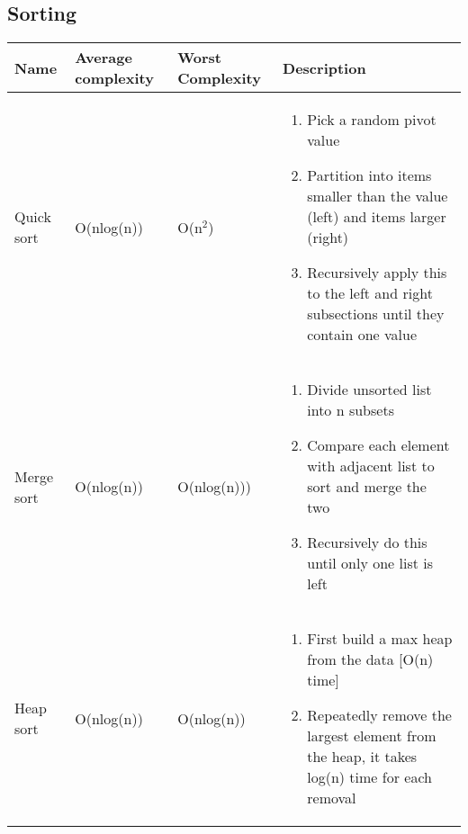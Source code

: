 \subsection{Sorting}

\begin{center}
\begin{longtable}{|l|l|l|p{7cm}|}
\hline
\textbf{Name} & \textbf{Average complexity} & \textbf{Worst Complexity} & \textbf{Description} \\
\hline
Quick sort & O(nlog(n)) & O(n$^{2}$) 
           & \begin{enumerate}
                \item Pick a random pivot value 
                \item Partition into items smaller than the value (left) and 
                      items larger (right)
                \item Recursively apply this to the left and right subsections
                      until they contain one value
              \end{enumerate}\\
\hline

Merge sort & O(nlog(n)) & O(nlog(n))) 
           & \begin{enumerate}
                \item Divide unsorted list into n subsets
                \item Compare each element with adjacent list to sort and merge
                      the two
                \item Recursively do this until only one list is left
              \end{enumerate}\\

\hline

Heap sort & O(nlog(n)) & O(nlog(n)) 
          & \begin{enumerate}
                \item First build a max heap from the data [O(n) time]
                \item Repeatedly remove the largest element from the heap, 
                      it takes log(n) time for each removal

              \end{enumerate}\\
\hline

\end{longtable}
\end{center}

